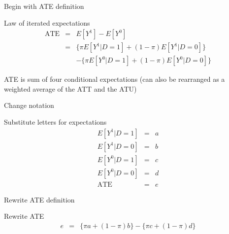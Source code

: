 \documentclass{beamer}
\begin{document}
\begin{frame}{Begin with ATE definition}

  \begin{block}{Law of iterated expectations}
    \begin{eqnarray*}
      \text{ATE}&=&E[Y^1]-E[Y^0]  \\
      &=& \{\pi E[Y^1 | D=1] + (1-\pi)E[Y^1 | D=0]\}  \\
      & & - \{\pi E[Y^0|D=1] + (1-\pi) E[Y^0 | D=0]\}
    \end{eqnarray*}
  \end{block}

\bigskip

ATE is sum of four conditional expectations (can also be rearranged as a weighted average of the ATT and the ATU)


\end{frame}

\begin{frame}{Change notation}



  \begin{block}{Substitute letters for expectations}
    \begin{eqnarray*}
      E[Y^1|D=1] &=& a  \\
      E[Y^1|D=0] &=& b  \\
      E[Y^0|D=1] &=& c  \\
      E[Y^0|D=0] &=& d  \\
      \text{ATE} &=& e
    \end{eqnarray*}
  \end{block}
  



\end{frame}

\begin{frame}{Rewrite ATE definition}


  \begin{block}{Rewrite ATE}
    \begin{eqnarray*}
      e&=&\{\pi{a} + (1-\pi)b\} - \{\pi{c} + (1-\pi)d\}
    \end{eqnarray*}
  \end{block}

\end{frame}
\end{document}
